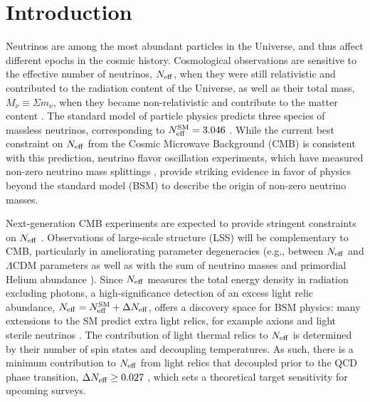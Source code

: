 \documentclass[twocolumn]{aastex631}
\begin{document}


\section{Introduction}

Neutrinos are among the most abundant particles in the Universe, and thus affect different epochs in the cosmic history. Cosmological observations are sensitive to the effective number of neutrinos, $N_{\rm eff}$, when they were still relativistic and contributed to the radiation content of the Universe, as well as their total mass, $M_\nu \equiv \Sigma m_\nu$, when they became non-relativistic and contribute to the matter content \citep{Abazajian:2016yjj,Lattanzi:2017ubx,Lesgourgues:2018ncw}. The standard model of particle physics predicts three species of massless neutrinos, corresponding to $N_{\rm eff}^{\rm SM} = 3.046$ \citep{Mangano:2005cc,Grohs:2015tfy,deSalas:2016ztq}. While the current best constraint on $N_{\rm eff}$ from the Cosmic Microwave Background (CMB) \citep{Aghanim:2018eyx} is consistent with this prediction, neutrino flavor oscillation experiments, which have measured non-zero neutrino mass splittings \citep{deSalas:2017kay,Esteban:2018azc}, provide  striking evidence in favor of physics beyond the standard model (BSM) to describe the origin of non-zero neutrino masses.

Next-generation CMB experiments \citep{SimonsObservatory:2018koc,Abazajian:2016yjj} are expected to provide stringent constraints on $N_{\rm eff}$ \citep{Green:2019glg}. Observations of large-scale structure (LSS) will be complementary to CMB, particularly in ameliorating parameter degeneracies (e.g., between $N_{\rm eff}$ and $\Lambda$CDM parameters as well as with the sum of neutrino masses and primordial Helium abundance \citep{Baumann:2017gkg,Sprenger:2018tdb,DePorzio:2020wcz}). Since $N_{\rm eff}$ measures the total energy density in radiation excluding photons, a high-significance detection of an excess light relic abundance, $N_{\rm eff} = N_{\rm eff}^{\rm SM} + \Delta N_{\rm eff}$, offers a discovery space for BSM physics: many extensions to the SM predict extra light relics, for example axions \citep{Baumann:2016wac} and light sterile neutrinos \citep{Abazajian:2012ys,Archidiacono:2014nda}. The contribution of light thermal relics to $N_{\rm eff}$ is determined by their number of spin states and decoupling temperatures. As such, there is a minimum contribution to $N_{\rm eff}$ from light relics that decoupled prior to the QCD phase transition, $\Delta N_{\rm eff} \geq 0.027$ \citep{Brust:2013ova,Chacko:2015noa}, which sets a theoretical target sensitivity for upcoming surveys. 
\end{document}
